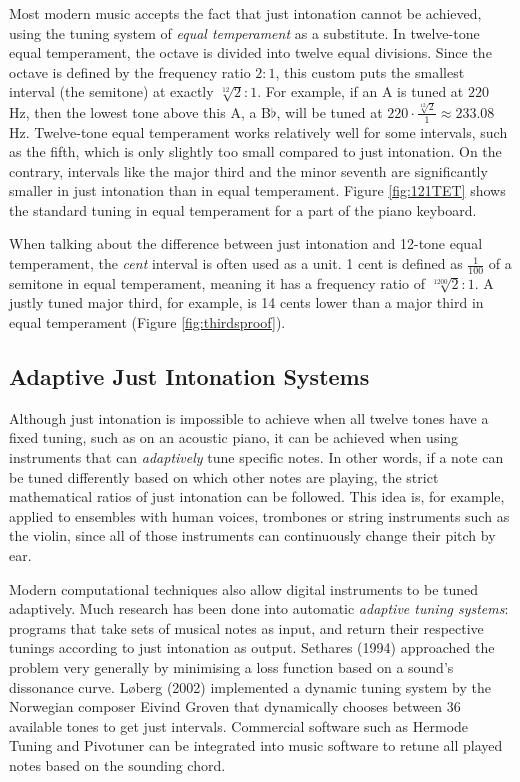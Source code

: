 \documentclass[a4paper]{article}
\begin{document}
Most modern music accepts the fact that just intonation cannot be achieved, using the tuning system of \textit{equal temperament} as a substitute. In twelve-tone equal temperament, the octave is divided into twelve equal divisions. Since the octave is defined by the frequency ratio $2:1$, this custom puts the smallest interval (the semitone) at exactly $\sqrt[12]{2}:1$. For example, if an A is tuned at $220$ Hz, then the lowest tone above this A, a B$\flat$, will be tuned at $220\cdot \frac{\sqrt[12]{2}}{1} \approx 233.08$ Hz.\cite{van_de_craats_fis_1989} Twelve-tone equal temperament works relatively well for some intervals, such as the fifth, which is only slightly too small compared to just intonation. On the contrary, intervals like the major third and the minor seventh are significantly smaller in just intonation than in equal temperament. Figure \ref{fig:121TET} shows the standard tuning in equal temperament for a part of the piano keyboard. 

When talking about the difference between just intonation and 12-tone equal temperament, the \textit{cent} interval is often used as a unit. 1 cent is defined as $\frac{1}{100}$ of a semitone in equal temperament, meaning it has a frequency ratio of $\sqrt[1200]{2}:1$. A justly tuned major third, for example, is 14 cents lower than a major third in equal temperament (Figure \ref{fig:thirdsproof}).

\subsection{Adaptive Just Intonation Systems}
\label{intro_adaptive_ji}

Although just intonation is impossible to achieve when all twelve tones have a fixed tuning, such as on an acoustic piano, it can be achieved when using instruments that can \textit{adaptively} tune specific notes. In other words, if a note can be tuned differently based on which other notes are playing, the strict mathematical ratios of just intonation can be followed. This idea is, for example, applied to ensembles with human voices, trombones or string instruments such as the violin, since all of those instruments can continuously change their pitch by ear.\cite{van_de_craats_fis_1989}

Modern computational techniques also allow digital instruments to be tuned adaptively. Much research has been done into automatic \textit{adaptive tuning systems}: programs that take sets of musical notes as input, and return their respective tunings according to just intonation as output. Sethares (1994) approached the problem very generally by minimising a loss function based on a sound's dissonance curve.\cite{sethares_adaptive_1994} Løberg (2002) implemented a dynamic tuning system by the Norwegian composer Eivind Groven that dynamically chooses between 36 available tones to get just intervals.\cite{code_grovenmax_2002} Commercial software such as Hermode Tuning\cite{mohrlok_hermode_2003} and Pivotuner\cite{noauthor_pivotuner_nodate} can be integrated into music software to retune all played notes based on the sounding chord.
\end{document}
